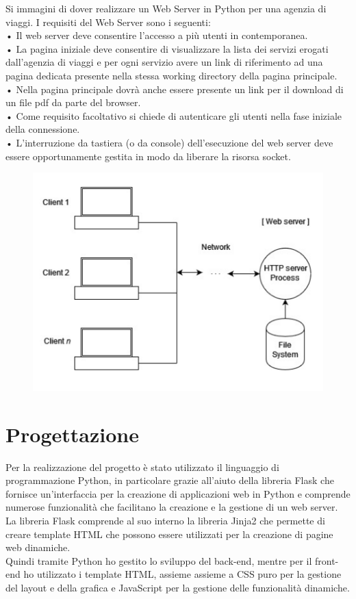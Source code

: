 \documentclass[12pt]{article}
\begin{document}
Si immagini di dover realizzare un Web Server in Python per una agenzia di viaggi.
I requisiti del Web Server sono i seguenti: \\
• Il web server deve consentire l’accesso a più utenti in contemporanea. \\
• La pagina iniziale deve consentire di visualizzare la lista dei servizi
erogati dall’agenzia di viaggi e per ogni servizio avere un link di
riferimento ad una pagina dedicata presente nella stessa working
directory della pagina principale. \\
• Nella pagina principale dovrà anche essere presente un link per il
download di un file pdf da parte del browser. \\
• Come requisito facoltativo si chiede di autenticare gli utenti nella fase
iniziale della connessione. \\
• L’interruzione da tastiera (o da console) dell’esecuzione del web server
deve essere opportunamente gestita in modo da liberare la risorsa
socket. \\
\begin{figure}[h]
    \includegraphics[width=0.5\linewidth]{requisiti.png}
    \centering
\end{figure}
\vskip 1.5cm


\section{Progettazione}

Per la realizzazione del progetto è stato utilizzato il linguaggio di programmazione Python, in particolare grazie all'aiuto della libreria Flask che fornisce un'interfaccia per la creazione di applicazioni web in Python e comprende numerose funzionalità che facilitano la creazione e la gestione di un web server. \\
La libreria Flask comprende al suo interno la libreria Jinja2 che permette di creare template HTML che possono essere utilizzati per la creazione di pagine web dinamiche. \\
Quindi tramite Python ho gestito lo sviluppo del back-end, mentre per il front-end ho utilizzato i template HTML, assieme assieme a CSS puro per la gestione del layout e della grafica e JavaScript per la gestione delle funzionalità dinamiche.
\end{document}
